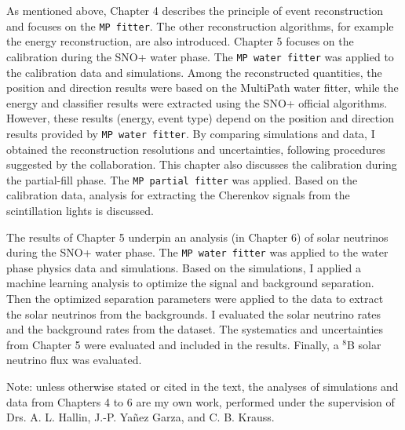 As mentioned above, Chapter 4 describes the principle of event reconstruction and focuses on the \texttt{MP fitter}. The other reconstruction algorithms, for example the energy reconstruction, are also introduced. Chapter 5 focuses on the calibration during the SNO+ water phase. The \texttt{MP water fitter} was applied to the calibration data and simulations. Among the reconstructed quantities, the position and direction results were based on the MultiPath water fitter, while the energy and classifier results were extracted using the SNO+ official algorithms. However, these results (energy, event type) depend on the position and direction results provided by \texttt{MP water fitter}. By comparing simulations and data, I obtained the reconstruction resolutions and uncertainties, following procedures suggested by the collaboration. This chapter also discusses the calibration during the partial-fill phase. The \texttt{MP partial fitter} was applied. Based on the calibration data, analysis for extracting the Cherenkov signals from the scintillation lights is discussed.

The results of Chapter 5 underpin an analysis (in Chapter 6) of solar neutrinos during the SNO+ water phase. The \texttt{MP water fitter} was applied to the water phase physics data and simulations. Based on the simulations, I applied a machine learning analysis to optimize the signal and background separation. Then the optimized separation parameters were applied to the data to extract the solar neutrinos from the backgrounds. I evaluated the solar neutrino rates and the background rates from the dataset. The systematics and uncertainties from Chapter 5 were evaluated and included in the results. Finally, a $^8$B solar neutrino flux was evaluated.

Note: unless otherwise stated or cited in the text, the analyses of simulations and data from Chapters 4 to 6 are my own work, performed under the supervision of Drs. A. L. Hallin, J.-P. Ya\~{n}ez Garza, and C. B. Krauss.
